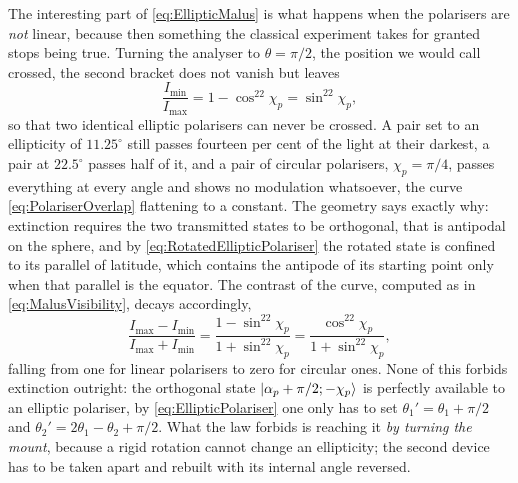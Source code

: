             The interesting part of \ref{eq:EllipticMalus} is what happens when the polarisers are \textit{not} linear, because then something the classical experiment takes for granted stops being true. Turning the analyser to $\theta=\pi/2$, the position we would call crossed, the second bracket does not vanish but leaves
            \begin{equation}\label{eq:ResidualTransmission}
                \frac{I_{\min}}{I_{\max}} = 1-\cos^22\chi_p = \sin^22\chi_p ,
            \end{equation}
            so that two identical elliptic polarisers can never be crossed. A pair set to an ellipticity of $11.25^{\circ}$ still passes fourteen per cent of the light at their darkest, a pair at $22.5^{\circ}$ passes half of it, and a pair of circular polarisers, $\chi_p=\pi/4$, passes everything at every angle and shows no modulation whatsoever, the curve \ref{eq:PolariserOverlap} flattening to a constant. The geometry says exactly why: extinction requires the two transmitted states to be orthogonal, that is antipodal on the sphere, and by \ref{eq:RotatedEllipticPolariser} the rotated state is confined to its parallel of latitude, which contains the antipode of its starting point only when that parallel is the equator. The contrast of the curve, computed as in \ref{eq:MalusVisibility}, decays accordingly,
            \begin{equation}\label{eq:EllipticMalusContrast}
                \frac{I_{\max}-I_{\min}}{I_{\max}+I_{\min}} = \frac{1-\sin^22\chi_p}{1+\sin^22\chi_p} = \frac{\cos^22\chi_p}{1+\sin^22\chi_p} ,
            \end{equation}
            falling from one for linear polarisers to zero for circular ones. None of this forbids extinction outright: the orthogonal state $\ket{\alpha_p+\pi/2;-\chi_p}$ is perfectly available to an elliptic polariser, by \ref{eq:EllipticPolariser} one only has to set $\theta_1'=\theta_1+\pi/2$ and $\theta_2'=2\theta_1-\theta_2+\pi/2$. What the law forbids is reaching it \textit{by turning the mount}, because a rigid rotation cannot change an ellipticity; the second device has to be taken apart and rebuilt with its internal angle reversed.

